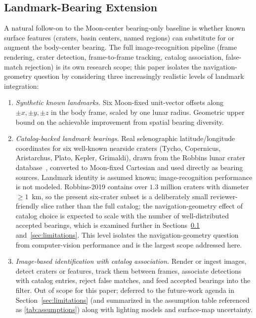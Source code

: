 \documentclass[10pt,twocolumn]{article}
\begin{document}
\subsection{Landmark-Bearing Extension}
\label{sec:realism-landmarks}
A natural follow-on to the Moon-center bearing-only baseline is whether known surface features (craters, basin centers, named regions) can substitute for or augment the body-center bearing.  The full image-recognition pipeline (frame rendering, crater detection, frame-to-frame tracking, catalog association, false-match rejection) is its own research scope; this paper isolates the navigation-geometry question by considering three increasingly realistic levels of landmark integration:

\begin{enumerate}
\item[\textbf{L1}] \emph{Synthetic known landmarks.}  Six Moon-fixed unit-vector offsets along $\pm x,\pm y,\pm z$ in the body frame, scaled by one lunar radius.  Geometric upper bound on the achievable improvement from spatial bearing diversity.
\item[\textbf{L2}] \emph{Catalog-backed landmark bearings.}  Real selenographic latitude/longitude coordinates for six well-known nearside craters (Tycho, Copernicus, Aristarchus, Plato, Kepler, Grimaldi), drawn from the Robbins lunar crater database~\cite{robbins2019}, converted to Moon-fixed Cartesian and used directly as bearing sources.  Landmark identity is assumed known; image-recognition performance is not modeled.  Robbins-2019 contains over $1.3$ million craters with diameter $\geq 1$~km, so the present six-crater subset is a deliberately small reviewer-friendly slice rather than the full catalog; the navigation-geometry effect of catalog choice is expected to scale with the number of well-distributed accepted bearings, which is examined further in Sections~\ref{sec:realism-landmarks} and~\ref{sec:limitations}.  This level isolates the navigation-geometry question from computer-vision performance and is the largest scope addressed here.
\item[\textbf{L3}] \emph{Image-based identification with catalog association.}  Render or ingest images, detect craters or features, track them between frames, associate detections with catalog entries, reject false matches, and feed accepted bearings into the filter.  Out of scope for this paper; deferred to the future-work agenda in Section~\ref{sec:limitations} (and summarized in the assumption table referenced as \ref{tab:assumptions}) along with lighting models and surface-map uncertainty.
\end{enumerate}
\end{document}
